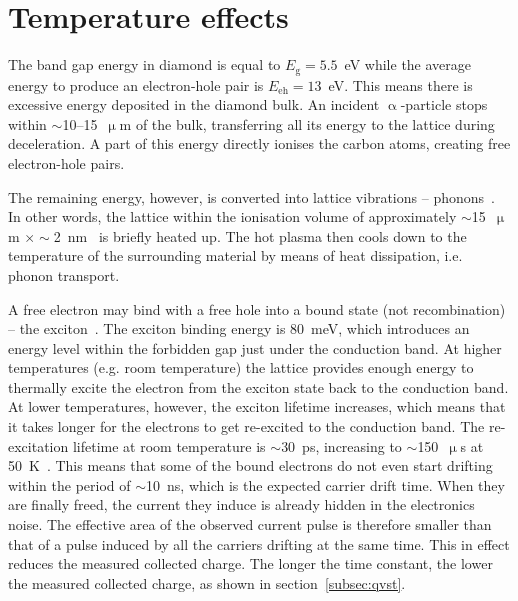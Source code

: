 \section{Temperature effects}
The band gap energy in diamond is equal to $E_\mathrm{g}=5.5$~eV while the average energy to produce an electron-hole pair is $E_{\mathrm{eh}}=13$~eV. This means there is excessive energy deposited in the diamond bulk. An incident $\upalpha$-particle stops within $\sim$10--15~$\upmu$m of the bulk, transferring all its energy to the lattice during deceleration. A part of this energy directly ionises the carbon atoms, creating free electron-hole pairs. 

The remaining energy, however, is converted into lattice vibrations -- phonons~\cite{PhysRevLett.13.13, Jansen:1956431}. In other words, the lattice within the ionisation volume  of approximately $\sim$15~$\upmu$m $\times\sim$2~nm~\cite{Jansen:1956431} is briefly heated up. The hot plasma then cools down to the temperature of the surrounding material by means of heat dissipation, i.e. phonon transport.

A free electron may bind with a free hole into a bound state (not recombination) -- the exciton~\cite{1970PhyEd...5..226L}. The exciton binding energy is 80~meV, which introduces an energy level within the forbidden gap just under the conduction band. At higher temperatures (e.g. room temperature) the lattice provides enough energy to thermally excite the electron from the exciton state back to the conduction band. At lower temperatures, however, the exciton lifetime increases, which means that it takes longer for the electrons to get re-excited to the conduction band. The re-excitation lifetime at room temperature is $\sim$30~ps, increasing to $\sim$150~$\upmu$s at 50~K~\cite{Jansen:1956431}. This means that some of the bound electrons do not even start drifting within the period of $\sim$10~ns, which is the expected carrier drift time. When they are finally freed, the current they induce is already hidden in the electronics noise. The effective area of the observed current pulse is therefore smaller than that of a pulse induced by all the carriers drifting at the same time. This in effect reduces the measured collected charge. The longer the time constant, the lower the measured collected charge, as shown in section~\ref{subsec:qvst}.

